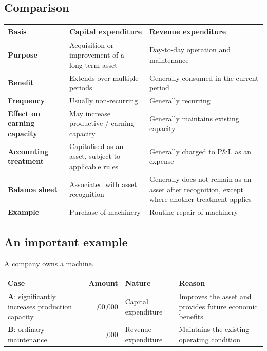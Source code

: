 \documentclass[11pt,a4paper]{article}
\newcommand{\Rs}{\ifmmode\text{\rsfont ₹}\else{\rsfont ₹}\fi}
\begin{document}
\subsection{Comparison}

\begin{center}
\small
\begin{tabularx}{\textwidth}{@{}l Y Y@{}}
\toprule
{}\textbf{Basis} & \textbf{Capital expenditure} & \textbf{Revenue expenditure}\\
\midrule
\textbf{Purpose} & Acquisition or improvement of a long-term asset & Day-to-day operation and maintenance\\
\textbf{Benefit} & Extends over multiple periods & Generally consumed in the current period\\
\textbf{Frequency} & Usually non-recurring & Generally recurring\\
\textbf{Effect on earning capacity} & May increase productive / earning capacity & Generally maintains existing capacity\\
\textbf{Accounting treatment} & Capitalised as an asset, subject to applicable rules & Generally charged to P\&L as an expense\\
\textbf{Balance sheet} & Associated with asset recognition & Generally does not remain as an asset after recognition, except where another treatment applies\\
\textbf{Example} & Purchase of machinery & Routine repair of machinery\\
\bottomrule
\end{tabularx}
\end{center}

\subsection{An important example}

A company owns a machine.

\begin{center}
\small
\begin{tabularx}{\textwidth}{@{}l r Y Y@{}}
\toprule
{}\textbf{Case} & \textbf{Amount} & \textbf{Nature} & \textbf{Reason}\\
\midrule
\textbf{A}: significantly increases production capacity & \Rs 2,00,000 & Capital expenditure & Improves the asset and provides future economic benefits\\
\textbf{B}: ordinary maintenance & \Rs 20,000 & Revenue expenditure & Maintains the existing operating condition\\
\bottomrule
\end{tabularx}
\end{center}
\end{document}
